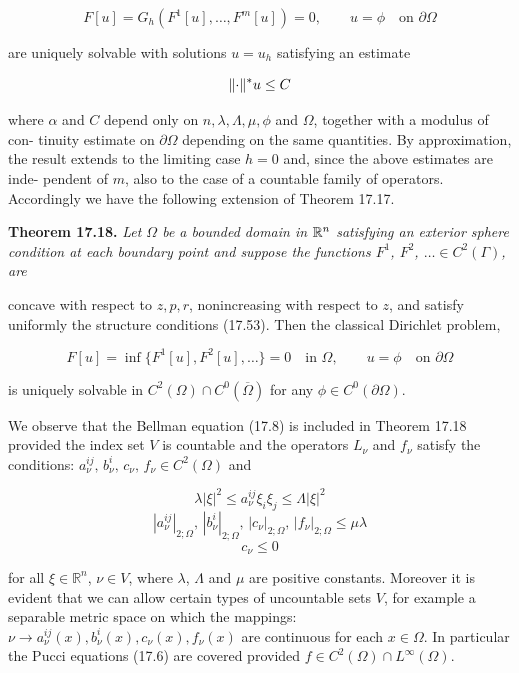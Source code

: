 \[
F[u]=G_h(F^1[u],\dots,F^m[u])=0,\qquad u=\phi \quad \text{on } \partial\Omega
\]

are uniquely solvable with solutions $u=u_h$ satisfying an estimate

\[
\lVert\cdot\rVert^{*}{u}\le C
\]

where $\alpha$ and $C$ depend only on $n,\lambda,\Lambda,\mu,\phi$ and $\Omega$, together with a modulus of con-
tinuity estimate on $\partial\Omega$ depending on the same quantities. By approximation, the
result extends to the limiting case $h=0$ and, since the above estimates are inde-
pendent of $m$, also to the case of a countable family of operators. Accordingly we
have the following extension of Theorem 17.17.

\textbf{Theorem 17.18.} \textit{Let $\Omega$ be a bounded domain in $\mathbb{R}^n$ satisfying an exterior sphere
condition at each boundary point and suppose the functions $F^1$, $F^2$, $\dots \in C^2(\Gamma)$, are}




concave with respect to $z,p,r$, nonincreasing with respect to $z$, and satisfy uniformly
the structure conditions (17.53). Then the classical Dirichlet problem,

\begin{equation}
F[u]=\inf \{F^1[u],F^2[u],\ldots\}=0 \quad \text{in }\Omega,\qquad u=\phi \quad \text{on }\partial\Omega
\tag{17.61}
\end{equation}

is uniquely solvable in $C^2(\Omega)\cap C^0(\overline{\Omega})$ for any $\phi\in C^0(\partial\Omega)$.

We observe that the Bellman equation (17.8) is included in Theorem 17.18
provided the index set $V$ is countable and the operators $L_\nu$ and $f_\nu$ satisfy the conditions:
$a_\nu^{ij},\, b_\nu^i,\, c_\nu,\, f_\nu \in C^2(\Omega)$ and

\begin{equation}
\lambda |\xi|^2 \le a_\nu^{ij}\xi_i\xi_j \le \Lambda |\xi|^2
\tag{17.62}
\end{equation}
\[
|a_\nu^{ij}|_{2;\Omega},\,|b_\nu^i|_{2;\Omega},\,|c_\nu|_{2;\Omega},\,|f_\nu|_{2;\Omega}\le \mu\lambda
\]
\[
c_\nu\le 0
\]

for all $\xi\in \mathbb{R}^n$, $\nu\in V$, where $\lambda$, $\Lambda$ and $\mu$ are positive constants. Moreover it is evident
that we can allow certain types of uncountable sets $V$, for example a separable
metric space on which the mappings: $\nu\to a_\nu^{ij}(x),b_\nu^i(x),c_\nu(x),f_\nu(x)$ are continuous for
each $x\in\Omega$. In particular the Pucci equations (17.6) are covered provided $f\in
C^2(\Omega)\cap L^\infty(\Omega)$.


